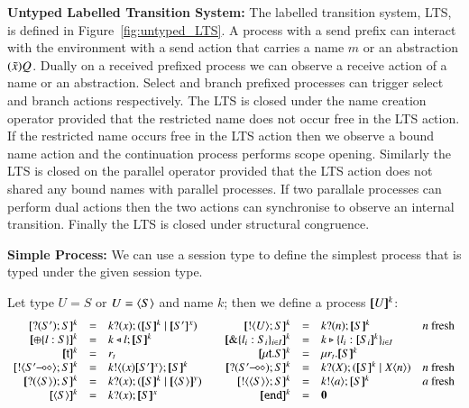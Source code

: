 

{\bf Untyped Labelled Transition System:}
The labelled transition system, LTS, is defined in Figure~\ref{fig:untyped_LTS}.
A process with a send prefix can interact with the environment with a send
action that carries a name $m$ or an abstraction $(\tilde{x})Q$. Dually
on a received prefixed process we can observe a receive action of a name or
an abstraction. Select and branch prefixed processes can trigger select
and branch actions respectively. The LTS is closed under the name creation
operator provided that the restricted name does not occur free in the LTS action.
If the restricted name occurs free in the LTS action then we observe a bound name
action and the continuation process performs scope opening. Similarly the LTS 
is closed on the parallel operator provided that the LTS action does not shared
any bound names with parallel processes. If two parallale processes can perform
dual actions then the two actions can synchronise to observe an internal transition.
Finally the LTS is closed under structural congruence.

{\bf Simple Process: }
We can use a session type to define the simplest process that is typed
under the given session type.
%
\begin{definition}\rm
	Let type $U = S$ or $U = \langle S \rangle$ and name $k$; then we define a process $[\!\![U]\!\!]^{k}$:
	\[
	\begin{array}{rclcrcll}
		\map{\btinp{S'} S}^{k} &=& \binp{k}{x} (\map{S}^{k} \Par \map{S'}^{x})
		&&
		\map{\btout{U} S}^{k} &=& \binp{k}{n} \map{S}^{k} & n\textrm{ fresh}
		\\

		\map{\btsel{l : S}}^{k} &=& \bsel{k}{l} \map{S}^{k}
		& &
		\map{\btbra{l_i: S_i}_{i \in I}}^{k} &=& \bbra{k}{l_i: \map{S_i}^{k}}_{i \in I}
		\\

		\map{\tvar{t}}^{k} &=& r_t
		& &
		\map{\trec{t}{S}}^{k} &=& \recp{r_t}{\map{S}^{k}}
		\\

		\map{\btout{\lhot{S'}} S}^{k} &=& \bout{k}{\abs{x} \map{S'}^x} \map{S}^k
		& &
		\map{\btinp{\lhot{S'}} S}^{k} &=& \binp{k}{X} (\map{S}^k \Par \appl{X}{n}) & n\textrm{ fresh}
		\\

		\map{\btinp{\chtype{S}} S}^{k} &=& \binp{k}{x} (\map{S}^k \Par \map{\chtype{S}}^y)
		&&
		\map{\btout{\chtype{S}} S}^{k} &=& \bout{k}{a} \map{S}^k  & a\textrm{ fresh}
		\\
		\map{\chtype{S}}^{k} &=& \binp{k}{x} \map{S}^x 
		&&
		\map{\tinact}^{k} &=& \inact
	\end{array}
	\] 
\end{definition}

